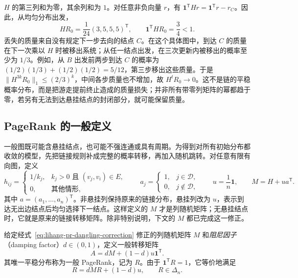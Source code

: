 \begin{solve}
$H$ 的第三列和为零，其余列和为 $1$。对任意非负向量 $r$，有 $\boldsymbol1^{\mathsf T}Hr=\boldsymbol1^{\mathsf T}r-r_C$。因此，从均匀分布出发，
\[
    HR_0=\frac1{24}(3,5,5,5)^{\mathsf T},\qquad
    \boldsymbol1^{\mathsf T}HR_0=\frac34<1.
\]
丢失的质量来自没有规定下一步去向的结点 $C$。在这个具体图中，到达 $C$ 的质量在下一次乘以 $H$ 时被移出系统；从任一结点出发，在三次更新内被移出的概率至少为 $1/3$。例如，从 $B$ 出发前两步到达 $C$ 的概率为 $(1/2)(1/3)+(1/2)(1/2)=5/12$，第三步移出这些质量。于是 $\|H^{3k}R_0\|_1\leq(2/3)^k$，中间各步质量也不增加，故 $H^tR_0\to0$。这不是链的平稳概率分布，而是把游走提前终止造成的质量损失；并非所有带零列矩阵的幂都趋于零，若另有无法到达悬挂结点的封闭部分，就可能保留质量。
\end{solve}

\subsection{PageRank 的一般定义}
\label{subsec:lihang-pr-general-definition}

一般图既可能含悬挂结点，也可能不强连通或具有周期。为得到对所有初始分布都收敛的模型，先把链接规则补成完整的概率转移，再加入随机跳转。对任意有限有向图，定义
\begin{equation}
\label{eq:lihang-pr-dangling-correction}
    h_{ij}=\begin{cases}
        1/k_j,&k_j>0\text{ 且 }(v_j,v_i)\in E,\\
        0,&\text{其他情形},
    \end{cases}
    \qquad a_j=\begin{cases}1,&j\in\mathcal D,\\0,&j\notin\mathcal D,\end{cases}
    \qquad u=\frac1n\boldsymbol1,\qquad M=H+ua^{\mathsf T}.
\end{equation}
其中 $a=(a_1,\ldots,a_n)^{\mathsf T}$。非悬挂列保持原来的链接分布，悬挂列改为 $u$，表示到达无出边结点后均匀选择下一结点。这样定义的 $M$ 才是列随机矩阵；无悬挂结点时，它就是原来的链接转移矩阵。除非特别说明，下文的 $M$ 都已完成这一修正。

\begin{definition}[一般 PageRank]
\label{def:lihang-pr-general}
给定经式~\eqref{eq:lihang-pr-dangling-correction} 修正的列随机矩阵 $M$ 和\emph{阻尼因子}（damping factor）$d\in(0,1)$，定义一般转移矩阵
\begin{equation}
\label{eq:lihang-pr-google-matrix}
    A=dM+(1-d)u\boldsymbol1^{\mathsf T}.
\end{equation}
其唯一平稳分布称为一般 PageRank，记为 $R$。由于 $\boldsymbol1^{\mathsf T}R=1$，它等价地满足
\begin{equation}
\label{eq:lihang-pr-general-fixed-point}
    R=dMR+(1-d)u,\qquad R\in\Delta_n.
\end{equation}
\end{definition}

